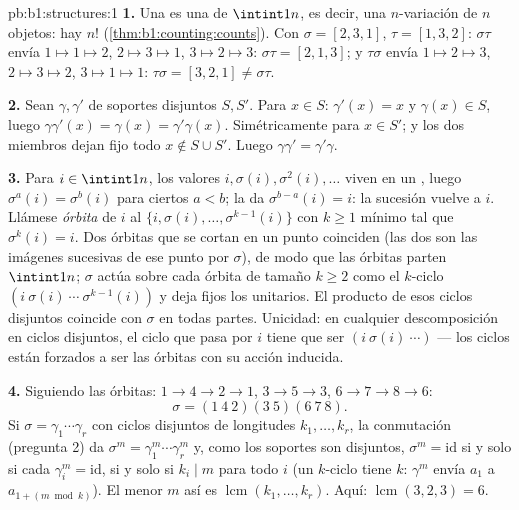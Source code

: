 \begin{solution}{pb:b1:structures:1}
\textbf{1.} Una  es una  de $\intint1n$, es
decir, una $n$-variación de $n$ objetos: hay $n!$
(\cref{thm:b1:counting:counts}). Con $\sigma = [2,3,1]$,
$\tau = [1,3,2]$: $\sigma\tau$ envía $1 \mapsto 1 \mapsto 2$,
$2 \mapsto 3 \mapsto 1$, $3 \mapsto 2 \mapsto 3$:
$\sigma\tau = [2,1,3]$; y $\tau\sigma$ envía $1 \mapsto 2 \mapsto 3$,
$2 \mapsto 3 \mapsto 2$, $3 \mapsto 1 \mapsto 1$:
$\tau\sigma = [3,2,1] \neq \sigma\tau$.

\textbf{2.} Sean $\gamma, \gamma'$ de soportes disjuntos $S, S'$. Para
$x \in S$: $\gamma'(x) = x$ y $\gamma(x) \in S$, luego
$\gamma\gamma'(x) = \gamma(x) = \gamma'\gamma(x)$. Simétricamente para
$x \in S'$; y los dos miembros dejan fijo todo $x \notin S \cup S'$.
Luego $\gamma\gamma' = \gamma'\gamma$.

\textbf{3.} Para $i \in \intint1n$, los valores $i, \sigma(i),
\sigma^2(i), \dots$ viven en un , luego
$\sigma^a(i) = \sigma^b(i)$ para ciertos $a < b$; la  da
$\sigma^{b-a}(i) = i$: la sucesión vuelve a $i$. Llámese \emph{órbita}
de $i$ al  $\{i, \sigma(i), \dots, \sigma^{k-1}(i)\}$ con
$k \geq 1$ mínimo tal que $\sigma^k(i) = i$. Dos órbitas que se cortan
en un punto coinciden (las dos son las imágenes sucesivas de ese punto
por $\sigma$), de modo que las órbitas parten $\intint1n$; $\sigma$
actúa sobre cada órbita de tamaño $k \geq 2$ como el $k$-ciclo
$(i\ \sigma(i)\ \cdots\ \sigma^{k-1}(i))$ y deja fijos los 
unitarios. El producto de esos ciclos disjuntos coincide con $\sigma$
en todas partes. Unicidad: en cualquier descomposición en ciclos
disjuntos, el ciclo que pasa por $i$ tiene que ser
$(i\ \sigma(i)\ \cdots)$ --- los ciclos están forzados a ser las
órbitas con su acción inducida.

\textbf{4.} Siguiendo las órbitas: $1 \to 4 \to 2 \to 1$,
$3 \to 5 \to 3$, $6 \to 7 \to 8 \to 6$:
\[
\sigma = (1\ 4\ 2)(3\ 5)(6\ 7\ 8) .
\]
Si $\sigma = \gamma_1\cdots\gamma_r$ con ciclos disjuntos de longitudes
$k_1, \dots, k_r$, la conmutación (pregunta 2) da
$\sigma^m = \gamma_1^m\cdots\gamma_r^m$ y, como los soportes son
disjuntos, $\sigma^m = \mathrm{id}$ si y solo si cada
$\gamma_i^m = \mathrm{id}$, si y solo si $k_i \mid m$ para todo $i$
(un $k$-ciclo tiene  $k$: $\gamma^m$ envía $a_1$ a
$a_{1 + (m \bmod k)}$). El menor $m$ así es
$\operatorname{lcm}(k_1, \dots, k_r)$. Aquí:
$\operatorname{lcm}(3, 2, 3) = 6$.


\end{solution}
